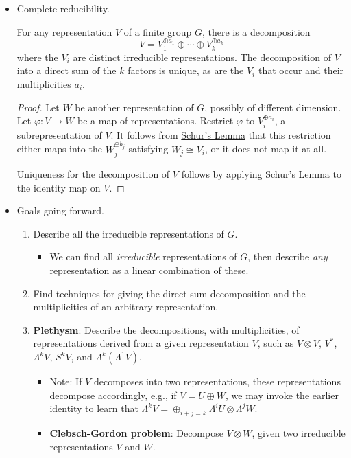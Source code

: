 \documentclass[../notes.tex]{subfiles}
\begin{document}
\begin{itemize}
\begin{FHlemma}
\begin{proof}
        \end{proof}
    \end{FHlemma}
    \item Complete reducibility.
    \begin{FHproposition}\label{prp:completeReducibility}
        For any representation $V$ of a finite group $G$, there is a decomposition
        \begin{equation*}
            V = V_1^{\oplus a_1}\oplus\cdots\oplus V_k^{\oplus a_k}
        \end{equation*}
        where the $V_i$ are distinct irreducible representations. The decomposition of $V$ into a direct sum of the $k$ factors is unique, as are the $V_i$ that occur and their multiplicities $a_i$.
        \begin{proof}
            Let $W$ be another representation of $G$, possibly of different dimension. Let $\varphi:V\to W$ be a map of representations. Restrict $\varphi$ to $V_i^{\oplus a_i}$, a subrepresentation of $V$. It follows from \hyperref[lem:Schur]{Schur's Lemma} that this restriction either maps into the $W_j^{\oplus b_j}$ satisfying $W_j\cong V_i$, or it does not map it at all.\par
            Uniqueness for the decomposition of $V$ follows by applying \hyperref[lem:Schur]{Schur's Lemma} to the identity map on $V$.
        \end{proof}
    \end{FHproposition}
    \item Goals going forward.
    \begin{enumerate}
        \item Describe all the irreducible representations of $G$.
        \begin{itemize}
            \item We can find all \emph{irreducible} representations of $G$, then describe \emph{any} representation as a linear combination of these.
        \end{itemize}
        \item Find techniques for giving the direct sum decomposition and the multiplicities of an arbitrary representation.
        \item \textbf{Plethysm}: Describe the decompositions, with multiplicities, of representations derived from a given representation $V$, such as $V\otimes V$, $V^*$, $\Lambda^kV$, $S^kV$, and $\Lambda^k(\Lambda^1V)$.
        \begin{itemize}
            \item Note: If $V$ decomposes into two representations, these representations decompose accordingly, e.g., if $V=U\oplus W$, we may invoke the earlier identity to learn that $\Lambda^kV=\oplus_{i+j=k}\Lambda^iU\otimes\Lambda^jW$.
            \item \textbf{Clebsch-Gordon problem}: Decompose $V\otimes W$, given two irreducible representations $V$ and $W$.
        \end{itemize}
    \end{enumerate}
\end{itemize}
\end{document}
